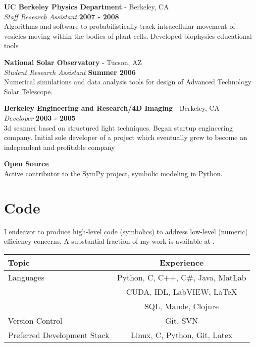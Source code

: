 \documentclass[margin,line]{res}
\begin{document}
\begin{resume}
{\bf UC Berkeley Physics Department} - Berkeley, CA\\
{\em Staff Research Assistant} \hfill {\bf 2007 - 2008}\\
Algorithms and software to probabilistically track intracellular movement of vesicles moving within the bodies of plant cells. Developed biophysics educational tools

{\bf National Solar Observatory} - Tucson, AZ\\
{\em Student Research Assistant} \hfill {\bf Summer 2006}\\
Numerical simulations and data analysis tools for design of Advanced Technology Solar Telescope.

{\bf Berkeley Engineering and Research/4D Imaging} - Berkeley, CA\\
{\em Developer} \hfill {\bf 2003 - 2005}\\
3d scanner based on structured light techniques. Began startup engineering company. Initial sole developer of a project which eventually grew to become an independent and profitable company

{\bf Open Source }\\
Active contributor to the SymPy project, symbolic modeling in Python.

\section{\sc Code}

I endeavor to produce high-level code (symbolics) to address low-level (numeric) efficiency concerns. A substantial fraction of my work is available at .

\begin{center}
\begin{tabular}{|l | c| }
\hline
Topic  & Experience  \\
\hline
\hline
Languages & Python, C,  C++, C\#, Java, MatLab \\
&  CUDA, IDL, LabVIEW, LaTeX \\
&  SQL, Maude, Clojure \\
\hline
Version Control & Git, SVN \\
\hline
Preferred Development Stack & Linux, C, Python, Git, Latex\\
\hline
\end{tabular}
\end{center}

\end{resume}
\end{document}
